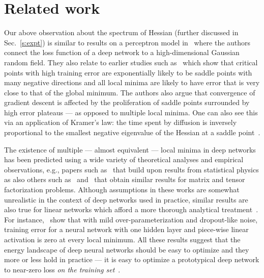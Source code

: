\documentclass[10pt]{article}
\begin{document}
\section{Related work}
\label{s:prior_work}

Our above observation about the spectrum of Hessian (further discussed in Sec.~\ref{s:expt}) is similar to results on a perceptron model in~\citet{dauphin2014identifying} where the authors connect the loss function of a deep network to a high-dimensional Gaussian random field. They also relate to earlier studies such as~\citet{Baldi:1989:NNP:70359.70362,Fyodorov2007,Bray2007} which show that critical points with high training error are exponentially likely to be saddle points with many negative directions and all local minima are likely to have error that is very close to that of the global minimum. The authors also argue that convergence of gradient descent is affected by the proliferation of saddle points surrounded by high error plateaus --- as opposed to multiple local minima. One can also see this via an application of Kramer's law: the time spent by diffusion is inversely proportional to the smallest negative eigenvalue of the Hessian at a saddle point~\citep{bovier2006metastability}.

The existence of multiple --- almost equivalent --- local minima in deep networks has been predicted using a wide variety of theoretical analyses and empirical observations, e.g., papers such as~\citet{spinglass2015,DBLP:conf/colt/ChoromanskaLA15,chaudhari2015trivializing} that build upon results from statistical physics as also others such as~\citet{haeffele2015global} and~\citet{janzamin2015beating} that obtain similar results for matrix and tensor factorization problems. Although assumptions in these works are somewhat unrealistic in the context of deep networks used in practice, similar results are also true for linear networks which afford a more thorough analytical treatment~\citep{DBLP:journals/corr/SaxeMG13}. For instance,~\citet{soudry2016no} show that with mild over-parameterization and dropout-like noise, training error for a neural network with one hidden layer and piece-wise linear activation is zero at every local minimum. All these results suggest that the energy landscape of deep neural networks should be easy to optimize and they more or less hold in practice --- it is easy to optimize a prototypical deep network to near-zero loss \emph{on the training set}~\citep{hardt2015train,DBLP:journals/corr/GoodfellowV14}.
\end{document}
